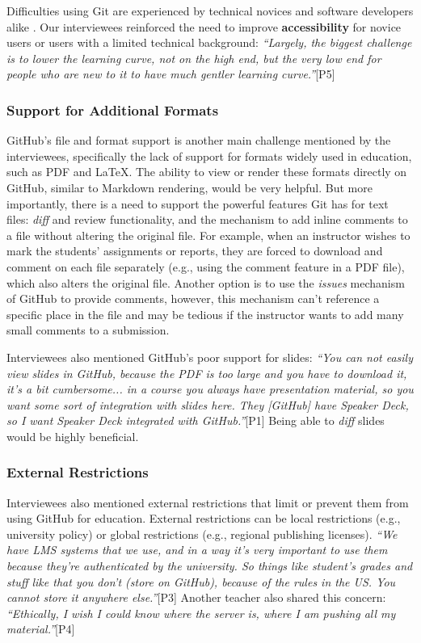 Difficulties using Git are experienced by technical novices and software developers alike \cite{perez2013s}. Our interviewees reinforced the need to improve \textbf{accessibility} for novice users or users with a limited technical background: \textit{``Largely, the biggest challenge is to lower the learning curve, not on the high end, but the very low end for people who are new to it to have much gentler learning curve.''}[P5]

\subsubsection{Support for Additional Formats}
GitHub's file and format support is another main challenge mentioned by the interviewees, specifically the lack of support for formats widely used in education, such as PDF and LaTeX. The ability to view or render these formats directly on GitHub, similar to Markdown rendering, would be very helpful. But more importantly, there is a need to support the powerful features Git has for text files: \textit{diff} and review functionality, and the mechanism to add inline comments to a file without altering the original file. For example, when an instructor wishes to mark the students' assignments or reports, they are forced to download and comment on each file separately (e.g., using the comment feature in a PDF file), which also alters the original file. Another option is to use the \textit{issues} mechanism of GitHub to provide comments, however, this mechanism can't reference a specific place in the file and may be tedious if the instructor wants to add many small comments to a submission.

Interviewees also mentioned GitHub's poor support for slides: \textit{``You can not easily view slides in GitHub, because the PDF is too large and you have to download it, it's a bit cumbersome... in a course you always have presentation material, so you want some sort of integration with slides here. They [GitHub] have Speaker Deck, so I want Speaker Deck integrated with GitHub.''}[P1] Being able to \textit{diff} slides would be highly beneficial.

\subsubsection{External Restrictions}
Interviewees also mentioned external restrictions that limit or prevent them from using GitHub for education. External restrictions can be local restrictions (e.g., university policy) or global restrictions (e.g., regional publishing licenses). \textit{``We have LMS systems that we use, and in a way it's very important to use them because they're authenticated by the university. So things like student's grades and stuff like that you don't (store on GitHub), because of the rules in the US. You cannot store it anywhere else.''}[P3]
Another teacher also shared this concern:
\textit{``Ethically, I wish I could know where the server is, where I am pushing all my material.''}[P4]


